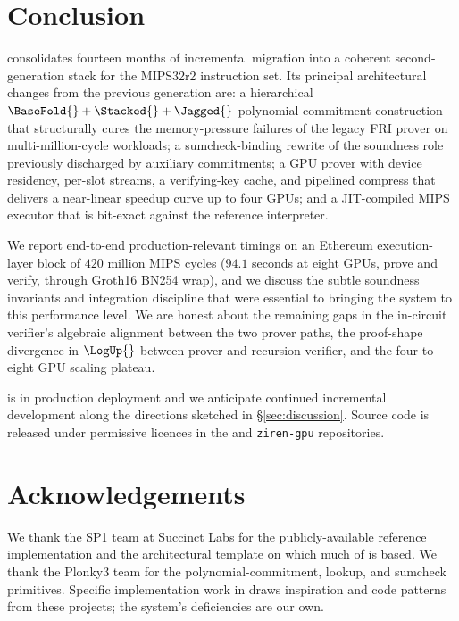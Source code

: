 \section{Conclusion}
\label{sec:conclusion}

\Zirenver{} consolidates fourteen months of incremental migration into a coherent second-generation \zkVM{} stack for the MIPS32r2 instruction set. Its principal architectural changes from the previous generation are: a hierarchical $\BaseFold{}+\Stacked{}+\Jagged{}$ polynomial commitment construction that structurally cures the memory-pressure failures of the legacy FRI prover on multi-million-cycle workloads; a sumcheck-binding rewrite of the soundness role previously discharged by auxiliary commitments; a GPU prover with device residency, per-slot streams, a verifying-key cache, and pipelined compress that delivers a near-linear speedup curve up to four GPUs; and a JIT-compiled MIPS executor that is bit-exact against the reference interpreter.

We report end-to-end production-relevant timings on an Ethereum execution-layer block of $420$ million MIPS cycles ($94.1$ seconds at eight GPUs, prove and verify, through Groth16 BN254 wrap), and we discuss the subtle soundness invariants and integration discipline that were essential to bringing the system to this performance level. We are honest about the remaining gaps in the in-circuit verifier's algebraic alignment between the two prover paths, the proof-shape divergence in $\LogUp{}$ between prover and recursion verifier, and the four-to-eight GPU scaling plateau.

\Zirenver{} is in production deployment and we anticipate continued incremental development along the directions sketched in \S\ref{sec:discussion}. Source code is released under permissive licences in the \Ziren{} and \texttt{ziren-gpu} repositories.

\section*{Acknowledgements}

We thank the SP1 team at Succinct Labs for the publicly-available reference implementation and the architectural template on which much of \Zirenver{} is based. We thank the Plonky3 team for the polynomial-commitment, lookup, and sumcheck primitives. Specific implementation work in \Zirenver{} draws inspiration and code patterns from these projects; the system's deficiencies are our own.

